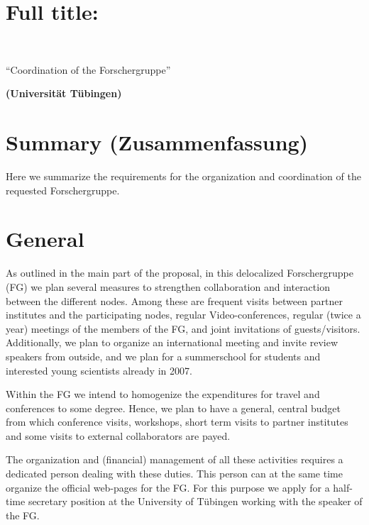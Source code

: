 \renewcommand{\projnr}{Z}
\renewcommand{\projtitleshort}{Coordination}
\renewcommand{\projauth}{Kley}
%
\setcounter{section}{0}
\noindent{\normalfont\sffamily\Large\bfseries Project \projnr: \projtitleshort}

\section{Full title:}
\hspace{1\baselineskip}\\
\centerline{\large ``Coordination of the Forschergruppe''}
\centerline{\bf (Universit\"at T\"ubingen)}
%
\section{Summary (Zusammenfassung)}
Here we summarize the requirements for the organization and
coordination of the requested Forschergruppe.
%
\section{General}
%
As outlined in the main part of the proposal, in this delocalized Forschergruppe (FG)
we plan several measures to strengthen collaboration and interaction between the 
different nodes.
Among these are frequent visits between partner institutes and the participating
nodes, regular Video-conferences, regular (twice a year) meetings of the members
of the FG, and joint invitations of guests/visitors.  
Additionally, we plan to organize an international meeting and invite review
speakers from outside, and we plan for a summerschool for students and interested young
scientists already in 2007.

Within the FG we intend to homogenize the expenditures for travel and conferences
to some degree. Hence, we plan to have a general, central budget from which
conference visits, workshops, short term visits to partner institutes and some
visits to external collaborators are payed.

The organization and (financial) management of all these activities requires
a dedicated person dealing with these duties. This person can at the same time
organize the official web-pages for the FG.
For this purpose we apply for a half-time secretary position
at the University of T\"ubingen working with the speaker of the FG.
%

